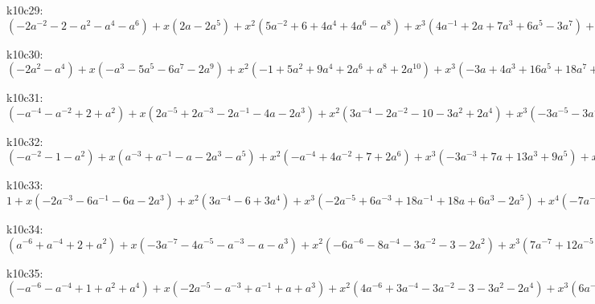 k10c29: $ (-2a^{-2}-2-a^{2}-a^{4}-a^{6}) +x(2a-2a^{5}) +x^{2}(5a^{-2}+6+4a^{4}+4a^{6}-a^{8}) +x^{3}(4a^{-1}+2a+7a^{3}+6a^{5}-3a^{7}) +x^{4}(-4a^{-2}-4+3a^{2}-5a^{4}-7a^{6}+a^{8}) +x^{5}(-6a^{-1}-8a-12a^{3}-7a^{5}+3a^{7}) +x^{6}(a^{-2}-3-9a^{2}+5a^{6}) +x^{7}(2a^{-1}+2a+5a^{3}+5a^{5}) +x^{8}(2+5a^{2}+3a^{4}) +x^{9}(a+a^{3}) $

k10c30: $ (-2a^{2}-a^{4}) +x(-a^{3}-5a^{5}-6a^{7}-2a^{9}) +x^{2}(-1+5a^{2}+9a^{4}+2a^{6}+a^{8}+2a^{10}) +x^{3}(-3a+4a^{3}+16a^{5}+18a^{7}+9a^{9}) +x^{4}(1-7a^{2}-11a^{4}+2a^{6}+2a^{8}-3a^{10}) +x^{5}(3a-6a^{3}-19a^{5}-20a^{7}-10a^{9}) +x^{6}(5a^{2}+2a^{4}-11a^{6}-7a^{8}+a^{10}) +x^{7}(5a^{3}+7a^{5}+5a^{7}+3a^{9}) +x^{8}(3a^{4}+6a^{6}+3a^{8}) +x^{9}(a^{5}+a^{7}) $

k10c31: $ (-a^{-4}-a^{-2}+2+a^{2}) +x(2a^{-5}+2a^{-3}-2a^{-1}-4a-2a^{3}) +x^{2}(3a^{-4}-2a^{-2}-10-3a^{2}+2a^{4}) +x^{3}(-3a^{-5}-3a^{-3}+6a^{-1}+15a+7a^{3}-2a^{5}) +x^{4}(-5a^{-4}+3a^{-2}+20+5a^{2}-7a^{4}) +x^{5}(a^{-5}-2a^{-3}-4a^{-1}-12a-10a^{3}+a^{5}) +x^{6}(2a^{-4}-3a^{-2}-14-6a^{2}+3a^{4}) +x^{7}(2a^{-3}+a^{-1}+3a+4a^{3}) +x^{8}(2a^{-2}+5+3a^{2}) +x^{9}(a^{-1}+a) $

k10c32: $ (-a^{-2}-1-a^{2}) +x(a^{-3}+a^{-1}-a-2a^{3}-a^{5}) +x^{2}(-a^{-4}+4a^{-2}+7+2a^{6}) +x^{3}(-3a^{-3}+7a+13a^{3}+9a^{5}) +x^{4}(a^{-4}-6a^{-2}-11+2a^{2}+3a^{4}-3a^{6}) +x^{5}(3a^{-3}-4a^{-1}-15a-18a^{3}-10a^{5}) +x^{6}(5a^{-2}+3-10a^{2}-7a^{4}+a^{6}) +x^{7}(5a^{-1}+7a+5a^{3}+3a^{5}) +x^{8}(3+6a^{2}+3a^{4}) +x^{9}(a+a^{3}) $

k10c33: $ 1 +x(-2a^{-3}-6a^{-1}-6a-2a^{3}) +x^{2}(3a^{-4}-6+3a^{4}) +x^{3}(-2a^{-5}+6a^{-3}+18a^{-1}+18a+6a^{3}-2a^{5}) +x^{4}(-7a^{-4}+a^{-2}+16+a^{2}-7a^{4}) +x^{5}(a^{-5}-9a^{-3}-16a^{-1}-16a-9a^{3}+a^{5}) +x^{6}(3a^{-4}-4a^{-2}-14-4a^{2}+3a^{4}) +x^{7}(4a^{-3}+5a^{-1}+5a+4a^{3}) +x^{8}(3a^{-2}+6+3a^{2}) +x^{9}(a^{-1}+a) $

k10c34: $ (a^{-6}+a^{-4}+2+a^{2}) +x(-3a^{-7}-4a^{-5}-a^{-3}-a-a^{3}) +x^{2}(-6a^{-6}-8a^{-4}-3a^{-2}-3-2a^{2}) +x^{3}(7a^{-7}+12a^{-5}+5a^{-3}-a^{-1}+a^{3}) +x^{4}(14a^{-6}+20a^{-4}+4a^{-2}+2a^{2}) +x^{5}(-5a^{-7}-6a^{-5}-5a^{-3}-2a^{-1}+2a) +x^{6}(-10a^{-6}-17a^{-4}-5a^{-2}+2) +x^{7}(a^{-7}-2a^{-5}-a^{-3}+2a^{-1}) +x^{8}(2a^{-6}+4a^{-4}+2a^{-2}) +x^{9}(a^{-5}+a^{-3}) $

k10c35: $ (-a^{-6}-a^{-4}+1+a^{2}+a^{4}) +x(-2a^{-5}-a^{-3}+a^{-1}+a+a^{3}) +x^{2}(4a^{-6}+3a^{-4}-3a^{-2}-3-3a^{2}-2a^{4}) +x^{3}(6a^{-5}+5a^{-3}-2a-3a^{3}) +x^{4}(-4a^{-6}+10a^{-2}+5+a^{4}) +x^{5}(-7a^{-5}-6a^{-3}-a^{-1}+2a^{3}) +x^{6}(a^{-6}-5a^{-4}-11a^{-2}-3+2a^{2}) +x^{7}(2a^{-5}+2a) +x^{8}(2a^{-4}+4a^{-2}+2) +x^{9}(a^{-3}+a^{-1}) $


